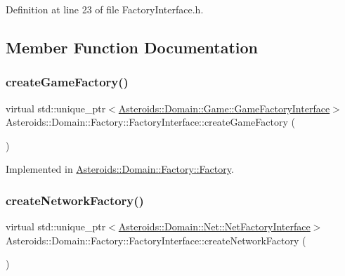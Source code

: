 Definition at line 23 of file Factory\+Interface.\+h.



\subsection{Member Function Documentation}
\mbox{\label{classAsteroids_1_1Domain_1_1Factory_1_1FactoryInterface_a1589f6b3a9c7d1ee34e9e312b6adb2c8}} 
\subsubsection{\texorpdfstring{create\+Game\+Factory()}{createGameFactory()}}
{\footnotesize\ttfamily virtual std\+::unique\+\_\+ptr$<$\hyperlink{classAsteroids_1_1Domain_1_1Game_1_1GameFactoryInterface}{Asteroids\+::\+Domain\+::\+Game\+::\+Game\+Factory\+Interface}$>$ Asteroids\+::\+Domain\+::\+Factory\+::\+Factory\+Interface\+::create\+Game\+Factory (\begin{DoxyParamCaption}{ }\end{DoxyParamCaption})\hspace{0.3cm}{\ttfamily [pure virtual]}}



Implemented in \hyperlink{classAsteroids_1_1Domain_1_1Factory_1_1Factory_a8029c274a6886b2aef3b31d1bd15da77}{Asteroids\+::\+Domain\+::\+Factory\+::\+Factory}.

\mbox{\label{classAsteroids_1_1Domain_1_1Factory_1_1FactoryInterface_ab638c74cc5a7cd464064b686b79f8056}} 
\subsubsection{\texorpdfstring{create\+Network\+Factory()}{createNetworkFactory()}}
{\footnotesize\ttfamily virtual std\+::unique\+\_\+ptr$<$\hyperlink{classAsteroids_1_1Domain_1_1Net_1_1NetFactoryInterface}{Asteroids\+::\+Domain\+::\+Net\+::\+Net\+Factory\+Interface}$>$ Asteroids\+::\+Domain\+::\+Factory\+::\+Factory\+Interface\+::create\+Network\+Factory (\begin{DoxyParamCaption}{ }\end{DoxyParamCaption})\hspace{0.3cm}{\ttfamily [pure virtual]}}



